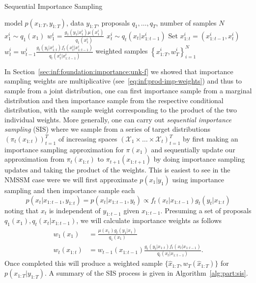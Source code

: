 \begin{algorithm}[tb]
	\caption{Sequential Importance Sampling}
	\label{alg:part:sis}
	\begin{spacing}{1.2}
		\begin{algorithmic}[1]
			\renewcommand{\algorithmicrequire}{\textbf{Inputs:}}
			\renewcommand{\algorithmicensure}{\textbf{Outputs:}}			 
			\Require model $p(x_{1:T},y_{1:T})$, data $y_{1:T}$, proposals $q_1,\dots,q_T$, number of samples $N$
			\State $x_1^i \sim q_1(x_1)$
			\State $w_1^i = \frac{g_1(y_1|x_1^i) \mu(x_1^i)}{q_1(x_1^i)}$
			\State $x_t^i \sim q_t(x_t | x_{1:t-1}^i)$ 
			\State Set $x_{1:t}^i = (x_{1:t-1}^{i},x_t^i)$
			\State $w_t^i = w_{t-1}^i \frac{g_t(y_t|x_{1:t}^i) f_t(x_t^i | x_{1:t-1}^{i})}{q_t(x_t^i|x_{1:t-1}^{i})}$
			\EndFor
			\EndFor
			\Ensure weighted samples $\left\{x_{1:T}^i,w_T^i\right\}_{i=1}^N$
		\end{algorithmic}
	\end{spacing}
\end{algorithm}


In Section~\ref{sec:inf:foundation:importance:unk-f} we showed that importance sampling weights
are multiplicative (see~\eqref{eq:inf:prod-imp-weights}) and thus to sample from a joint
distribution, one can first importance sample from a marginal distribution and then importance
sample from the respective conditional distribution, with the sample weight corresponding to the
product of the two individual weights.  More generally, one can carry out \emph{sequential importance
	sampling} (SIS) where we sample from a series of target distributions $(\pi_t(x_{1:t}))_{t = 1}^T$ of 
increasing spaces $(\mathcal{X}_1 \times \dots \times \mathcal{X}_t)_{t = 1}^T$ by first making
an importance sampling approximation for $\pi(x_1)$ and sequentially update our approximation from
$\pi_t(x_{1:t})$ to $\pi_{t+1}(x_{1:t+1})$ by doing importance sampling updates and taking the product of
the weights.  This is easiest to see in the NMSSM case were we will first approximate $p(x_1 | y_1)$
using importance sampling and then importance sample each 
\[
p (x_t | x_{1:t-1}, y_{1:t})=p(x_t | x_{1:t-1}, y_t)\propto f_{t}(x_t | x_{1:t-1}) g_{t}(y_t | x_{1:t})
\]
noting that $x_t$ is independent of $y_{1:t-1}$ given $x_{1:t-1}$.  Presuming a set of proposals 
$q_1(x_1), q_t(x_t | x_{1:t-1})$, we will calculate importance weights as follows
\begin{subequations}
	\label{eq:part:sis-weights}
\begin{align}
w_1 (x_1) &= \frac{\mu (x_1)g_{t}(y_1 | x_1)}{q_1(x_1)} \\
w_t (x_{1:t}) &= w_{t-1} (x_{1:t-1}) \frac{g_{t}(y_t|x_{1:t}) f_{t}(x_t | x_{1:t-1})}{q_t(x_t|x_{1:t-1})}.
\end{align}
\end{subequations}
Once completed this will produce a weighted sample $\{\hat{x}_{1:T},w_T(\hat{x}_{1:T})\}$ for 
$p(x_{1:T} | y_{1:T})$.  A summary of the SIS process is given in Algorithm~\ref{alg:part:sis}.

